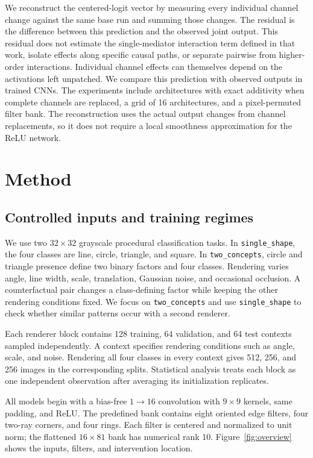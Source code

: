 \documentclass[pdflatex,sn-basic]{sn-jnl}
\begin{document}
We reconstruct the centered-logit vector by measuring every individual channel change against the same base run and summing those changes. The residual is the difference between this prediction and the observed joint output. This residual does not estimate the single-mediator interaction term defined in that work, isolate effects along specific causal paths, or separate pairwise from higher-order interactions. Individual channel effects can themselves depend on the activations left unpatched. We compare this prediction with observed outputs in trained CNNs. The experiments include architectures with exact additivity when complete channels are replaced, a grid of 16 architectures, and a pixel-permuted filter bank. The reconstruction uses the actual output changes from channel replacements, so it does not require a local smoothness approximation for the ReLU network.

\section{Method}\label{sec:method}

\subsection{Controlled inputs and training regimes}

We use two $32\times32$ grayscale procedural classification tasks. In \texttt{single\_shape}, the four classes are line, circle, triangle, and square. In \texttt{two\_concepts}, circle and triangle presence define two binary factors and four classes. Rendering varies angle, line width, scale, translation, Gaussian noise, and occasional occlusion. A counterfactual pair changes a class-defining factor while keeping the other rendering conditions fixed. We focus on \texttt{two\_concepts} and use \texttt{single\_shape} to check whether similar patterns occur with a second renderer.

Each renderer block contains 128 training, 64 validation, and 64 test contexts sampled independently. A context specifies rendering conditions such as angle, scale, and noise. Rendering all four classes in every context gives 512, 256, and 256 images in the corresponding splits. Statistical analysis treats each block as one independent observation after averaging its initialization replicates.

All models begin with a bias-free $1\!\to\!16$ convolution with $9\times9$ kernels, same padding, and ReLU. The predefined bank contains eight oriented edge filters, four two-ray corners, and four rings. Each filter is centered and normalized to unit norm; the flattened $16\times81$ bank has numerical rank 10. Figure~\ref{fig:overview} shows the inputs, filters, and intervention location.
\end{document}
